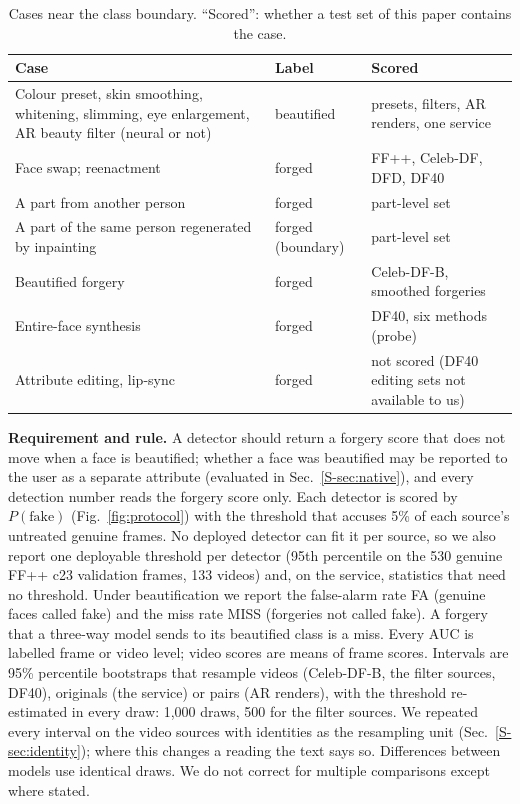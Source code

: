 \documentclass[conference]{IEEEtran}
\begin{document}
\begin{table}[t]
\centering
\caption{Cases near the class boundary. ``Scored'': whether a test set of this paper contains the case.}
\label{tab:boundary}
\footnotesize
\setlength{\tabcolsep}{2.5pt}
\begin{tabular}{@{}>{\raggedright\arraybackslash}p{}>{\raggedright\arraybackslash}p{}>{\raggedright\arraybackslash}p{}@{}}
\toprule
Case & Label & Scored \\
\midrule
Colour preset, skin smoothing, whitening, slimming, eye enlargement, AR beauty filter (neural or not) & beautified & presets, filters, AR renders, one service \\
Face swap; reenactment & forged & FF++, Celeb-DF, DFD, DF40 \\
A part from another person & forged & part-level set \\
A part of the same person regenerated by inpainting & forged (boundary) & part-level set \\
Beautified forgery & forged & Celeb-DF-B, smoothed forgeries \\
Entire-face synthesis & forged & DF40, six methods (probe) \\
Attribute editing, lip-sync & forged & not scored (DF40 editing sets not available to us) \\
\bottomrule
\end{tabular}
\end{table}

\textbf{Requirement and rule.} A detector should return a forgery score that does not move when a face is beautified; whether a
face was beautified may be reported to the user as a separate attribute (evaluated in Sec.~\ref{S-sec:native}), and every
detection number reads the forgery score only. Each detector is scored by $P(\text{fake})$ (Fig.~\ref{fig:protocol}) with the threshold that accuses 5\%
of each source's untreated genuine frames. No deployed detector can fit it per source, so we also report one deployable
threshold per detector (95th percentile on the 530 genuine FF++ c23 validation frames, 133 videos) and, on the service,
statistics that need no threshold. Under
beautification we report the false-alarm rate FA (genuine faces called fake) and the miss rate MISS (forgeries not called
fake). A forgery that a three-way model sends to its beautified class is a miss. Every AUC is labelled frame or video level;
video scores are means of frame scores. Intervals are 95\% percentile bootstraps that resample videos (Celeb-DF-B, the filter
sources, DF40), originals (the service) or pairs (AR renders), with the threshold re-estimated in every draw: 1,000 draws, 500
for the filter sources. We repeated every interval on the video sources with identities as the resampling unit
(Sec.~\ref{S-sec:identity}); where this changes a reading the text says so. Differences between models use identical
draws. We do not correct for multiple comparisons except where stated.
\end{document}
